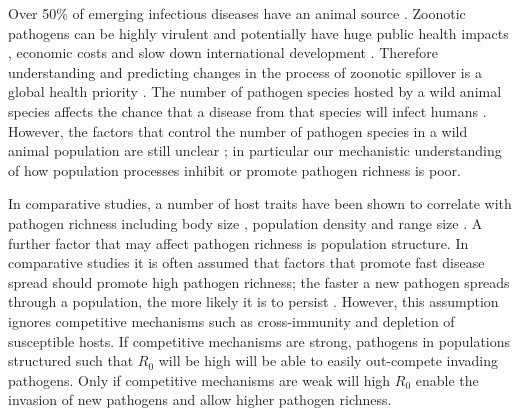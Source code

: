 
Over 50\% of emerging infectious diseases have an animal source \cite{jones2008global, smith2014global}.
Zoonotic pathogens can be highly virulent \cite{luby2009recurrent, lefebvre2014case} and potentially have huge public health impacts \cite{granich2015trends}, economic costs \cite{knobler2004learning} and slow down international development \cite{ebolaWorldbank}.
Therefore understanding and predicting changes in the process of zoonotic spillover is a global health priority \cite{taylor2001risk}.
The number of pathogen species hosted by a wild animal species affects the chance that a disease from that species will infect humans \cite{wolfe2000deforestation}.
However, the factors that control the number of pathogen species in a wild animal population are still unclear \cite{metcalf2015five}; in particular our mechanistic understanding of how population processes inhibit or promote pathogen richness is poor.







In comparative studies, a number of host traits have been shown to correlate with pathogen richness including body size \cite{kamiya2014determines, arneberg2002host}, population density \cite{nunn2003comparative, arneberg2002host} and range size \cite{bordes2011impact, kamiya2014determines}.
A further factor that may affect pathogen richness is population structure.
In comparative studies it is often assumed that factors that promote fast disease spread should promote high pathogen richness; the faster a new pathogen spreads through a population, the more likely it is to persist \cite{nunn2003comparative, morand2000wormy, poulin2014parasite, poulin2000diversity, altizer2003social}.
However, this assumption ignores competitive mechanisms such as cross-immunity and depletion of susceptible hosts.
If competitive mechanisms are strong, pathogens in populations structured such that $R_0$ will be high will be able to easily out-compete invading pathogens.
Only if competitive mechanisms are weak will high $R_0$  enable the invasion of new pathogens and allow higher pathogen richness.


